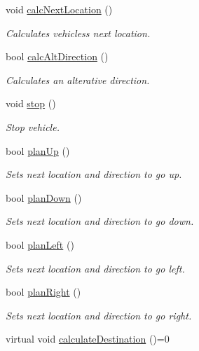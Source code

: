 \begin{DoxyCompactItemize}
\item 
void \hyperlink{class_vehicle_ac9912b051f2247d7a297a4e9e7657a6b}{calc\+Next\+Location} ()
\begin{DoxyCompactList}\small\item\em Calculates vehicles\textquotesingle{}s next location. \end{DoxyCompactList}\item 
bool \hyperlink{class_vehicle_afb6e10a4886f8f1f05f260a550fd8650}{calc\+Alt\+Direction} ()
\begin{DoxyCompactList}\small\item\em Calculates an alterative direction. \end{DoxyCompactList}\item 
void \hyperlink{class_vehicle_a837e3c110672946892026ca6bfd21b27}{stop} ()
\begin{DoxyCompactList}\small\item\em Stop vehicle. \end{DoxyCompactList}\item 
bool \hyperlink{class_vehicle_ac89c292d9ac2c1f2183d068e8fa6d9be}{plan\+Up} ()
\begin{DoxyCompactList}\small\item\em Sets next location and direction to go up. \end{DoxyCompactList}\item 
bool \hyperlink{class_vehicle_a7da6a084ba2cf4fbe68ed3060bb712a3}{plan\+Down} ()
\begin{DoxyCompactList}\small\item\em Sets next location and direction to go down. \end{DoxyCompactList}\item 
bool \hyperlink{class_vehicle_ad3450983a521a908fe67e67e6457ff81}{plan\+Left} ()
\begin{DoxyCompactList}\small\item\em Sets next location and direction to go left. \end{DoxyCompactList}\item 
bool \hyperlink{class_vehicle_ac2202fc51fc16e2e8c5edd4222368d3d}{plan\+Right} ()
\begin{DoxyCompactList}\small\item\em Sets next location and direction to go right. \end{DoxyCompactList}\item 
virtual void \hyperlink{class_vehicle_a90c2c61dde3e87728bca29b4ebe40a95}{calculate\+Destination} ()=0
\end{DoxyCompactItemize}
